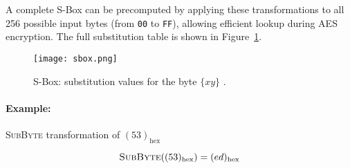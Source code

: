 A complete S-Box can be precomputed by applying these transformations to all 256 possible input bytes (from \texttt{00} to \texttt{FF}), allowing efficient lookup during AES encryption. 
The full substitution table is shown in Figure~\ref{fig:sbox}.

\begin{figure}[h]
    \centering
    \texttt{[image: sbox.png]}
    \caption{S-Box: substitution values for the byte $\{xy\}$ \cite{NIST_AES}.}
    \label{fig:sbox}
\end{figure}


\paragraph{Example:} \textsc{SubByte} transformation of $(53)_{\text{hex}}$

\begin{equation}
    \textsc{SubByte}((53)_{\text{hex}}) = (ed)_{\text{hex}}
\end{equation}
